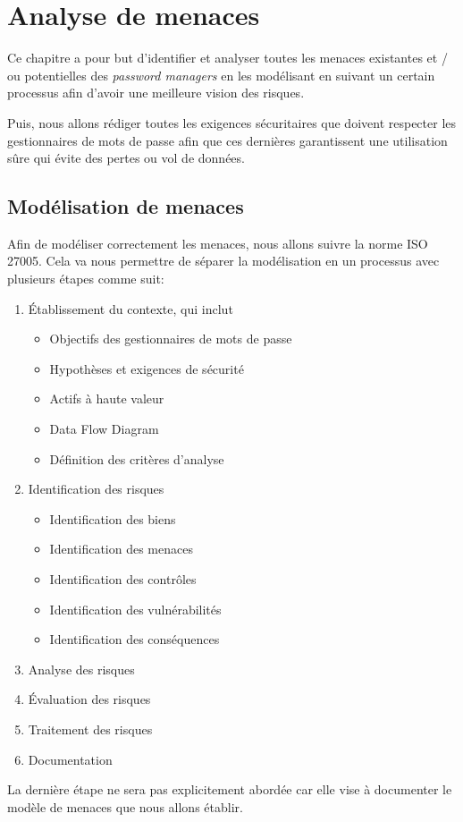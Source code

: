 
\chapter{Analyse de menaces}
\label{ch:analyse_menaces}

Ce chapitre a pour but d'identifier et analyser toutes les menaces existantes et / ou potentielles des \textit{password managers} en les modélisant en suivant un certain processus afin d'avoir une meilleure vision des risques.

Puis, nous allons rédiger toutes les exigences sécuritaires que doivent respecter les gestionnaires de mots de passe afin que ces dernières garantissent une utilisation sûre qui évite des pertes ou vol de données.

\section{Modélisation de menaces}
Afin de modéliser correctement les menaces, nous allons suivre la norme ISO 27005\cite{ISO27005}. Cela va nous permettre de séparer la modélisation en un processus avec plusieurs étapes comme suit:

\begin{enumerate}
	\item Établissement du contexte, qui inclut
	\begin{itemize}
		\item Objectifs des gestionnaires de mots de passe
		\item Hypothèses et exigences de sécurité
		\item Actifs à haute valeur 
		\item Data Flow Diagram
		\item Définition des critères d'analyse
	\end{itemize}
	\item Identification des risques
		\begin{itemize}
		\item Identification des biens
		\item Identification des menaces
		\item Identification des contrôles
		\item Identification des vulnérabilités
		\item Identification des conséquences
	\end{itemize}
	\item Analyse des risques
	\item Évaluation des risques
	\item Traitement des risques
	\item Documentation 
\end{enumerate}
La dernière étape ne sera pas explicitement abordée car elle vise à documenter le modèle de menaces que nous allons établir.

